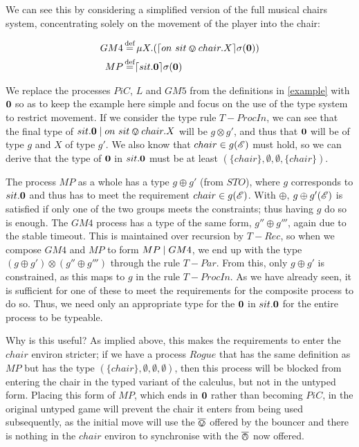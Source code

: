 We can see this by considering a simplified version of the full
musical chairs system, concentrating solely on the movement of the
player into the chair:

\begin{equation}
\begin{aligned}
GM4 & \operatorname{\stackrel{\textrm{def}}{=}} \mu X.(\lceil{on\ sit \varovee chair.X}\rceil {\sigma} ({\textbf{0}})) \\
MP & \operatorname{\stackrel{\textrm{def}}{=}} \lceil{sit.\textbf{0}}\rceil {\sigma} ({\textbf{0}})
\end{aligned}
\end{equation}

\noindent We replace the processes $PiC$, $L$ and $GM5$ from the
definitions in \ref{example} with $\textbf{0}$ so as to keep the example
here simple and focus on the use of the type system to restrict
movement.  If we consider the type rule $T-ProcIn$, we can see that the
final type of $sit.\textbf{0} \;|\; on\ sit \varovee chair.X$ will be $g \otimes
g'$, and thus that $\textbf{0}$ will be of type $g$ and $X$ of type $g'$.
We also know that $chair \in g(\mathscr{E})$ must hold, so we can derive
that the type of $\textbf{0}$ in $sit.\textbf{0}$ must be at least $(\{chair\},
\emptyset, \emptyset, \{chair\})$.

The process $MP$ as a whole has a type $g \oplus g'$ (from $STO$),
where $g$ corresponds to $sit.\textbf{0}$ and thus has to meet the
requirement $chair \in g(\mathscr{E})$.  With $\oplus$, $g \oplus
  g'(\mathscr{E})$ is satisfied if only one of the two groups meets the
constraints; thus having $g$ do so is enough.  The $GM4$ process has a
type of the same form, $g'' \oplus g'''$, again due to the stable
timeout.  This is maintained over recursion by $T-Rec$, so when we
compose $GM4$ and $MP$ to form $MP \;|\; GM4$, we end up with the type
$(g \oplus g') \otimes (g'' \oplus g''')$ through the rule $T-Par$.
From this, only $g \oplus g'$ is constrained, as this maps to $g$ in
the rule $T-ProcIn$.  As we have already seen, it is sufficient for
one of these to meet the requirements for the composite process to do
so.  Thus, we need only an appropriate type for the $\textbf{0}$ in
$sit.\textbf{0}$ for the entire process to be typeable.

Why is this useful? As implied above, this makes the requirements to
enter the $chair$ environ stricter; if we have a process $Rogue$ that
has the same definition as $MP$ but has the type
$(\{chair\},\emptyset,\emptyset,\emptyset)$, then this process will be
blocked from entering the chair in the typed variant of the calculus,
but not in the untyped form.  Placing this form of $MP$, which ends in
$\textbf{0}$ rather than becoming $PiC$, in the original untyped game will
prevent the chair it enters from being used subsequently, as the
initial move will use the $\overline{\varovee}$ offered by the bouncer and there is
nothing in the $chair$ environ to synchronise with the $\overline{\varowedge}$ now
offered.

